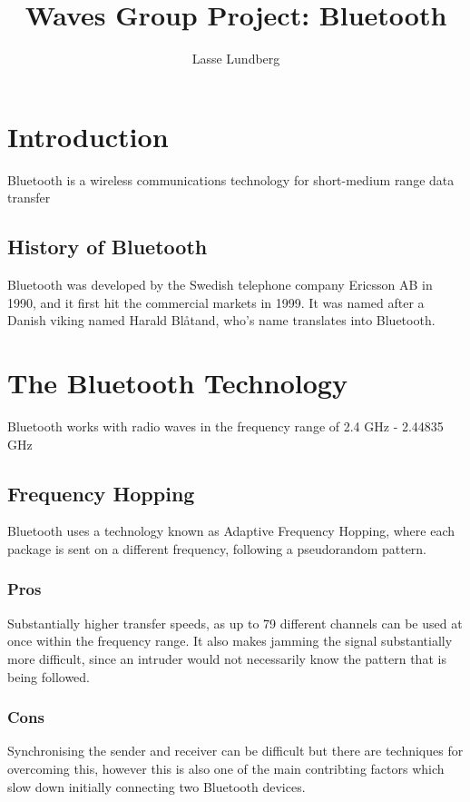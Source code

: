 \documentclass{article}
\title{Waves Group Project: Bluetooth}
\author{Lasse Lundberg}
\begin{document}
	\maketitle
	\newpage
	
	
	\section{Introduction}
		Bluetooth is a wireless communications technology for short-medium range data transfer
	
	\subsection{History of Bluetooth}
		Bluetooth was developed by the Swedish telephone company Ericsson AB in 1990, and it first hit the commercial markets in 1999. It was named after a Danish viking named Harald Blåtand, who's name translates into Bluetooth. 

	\section{The Bluetooth Technology}
		Bluetooth works with radio waves in the frequency range of 2.4 GHz - 2.44835 GHz
	
		\subsection{Frequency Hopping}
			Bluetooth uses a technology known as Adaptive Frequency Hopping, where each package is sent on a different frequency, following a pseudorandom pattern. 
			
			\subsubsection{Pros}
				Substantially higher transfer speeds, as up to 79 different channels can be used at once within the frequency range. It also makes jamming the signal substantially more difficult, since an intruder would not necessarily know the pattern that is being followed. 
			
			\subsubsection{Cons}
				Synchronising the sender and receiver can be difficult but there are techniques for overcoming this, however this is also one of the main contribting factors which slow down initially connecting two Bluetooth devices.
				
\end{document}
